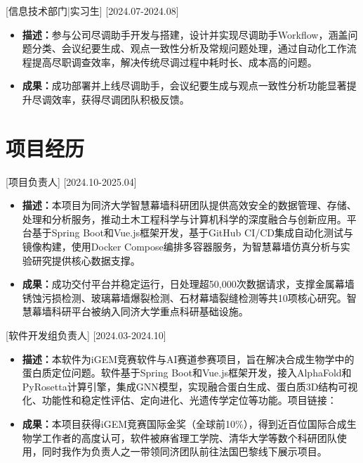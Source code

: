 \documentclass{style/template}
\begin{document}
[\textnormal{信息技术部门|}实习生]
[2024.07-2024.08]
\begin{itemize}
    \item \textbf{描述：}参与公司尽调助手开发与搭建，设计并实现尽调助手Workflow，涵盖问题分类、会议纪要生成、观点一致性分析及常规问题处理，通过自动化工作流程提高尽职调查效率，解决传统尽调过程中耗时长、成本高的问题。
    \item \textbf{成果：}成功部署并上线尽调助手，会议纪要生成与观点一致性分析功能显著提升尽调效率，获得尽调团队积极反馈。
\end{itemize}

\section{项目经历}

[项目负责人]
[2024.10-2025.04]
\begin{itemize}
    \item \textbf{描述：}本项目为同济大学智慧幕墙科研团队提供高效安全的数据管理、存储、处理和分析服务，推动土木工程科学与计算机科学的深度融合与创新应用。平台基于Spring Boot和Vue.js框架开发，基于GitHub CI/CD集成自动化测试与镜像构建，使用Docker Compose编排多容器服务，为智慧幕墙仿真分析与实验研究提供核心数据支撑。
    \item \textbf{成果：}成功交付平台并稳定运行，日处理超50,000次数据请求，支撑金属幕墙锈蚀污损检测、玻璃幕墙爆裂检测、石材幕墙裂缝检测等共10项核心研究。智慧幕墙科研平台被纳入同济大学重点科研基础设施。
\end{itemize}

[软件开发组负责人]
[2024.03-2024.10]
\begin{itemize}
    \item \textbf{描述：}本软件为iGEM竞赛软件与AI赛道参赛项目，旨在解决合成生物学中的蛋白质定位问题。软件基于Spring Boot和Vue.js框架开发，接入AlphaFold和PyRosetta计算引擎，集成GNN模型，实现融合蛋白生成、蛋白质3D结构可视化、功能性和稳定性评估、定向进化、光遗传学定位等功能。项目链接：
    \item \textbf{成果：}本项目获得iGEM竞赛国际金奖（全球前10\%），得到近百位国际合成生物学工作者的高度认可，软件被麻省理工学院、清华大学等数个科研团队使用，同时我作为负责人之一带领同济团队前往法国巴黎线下展示项目。
\end{itemize}
\end{document}
